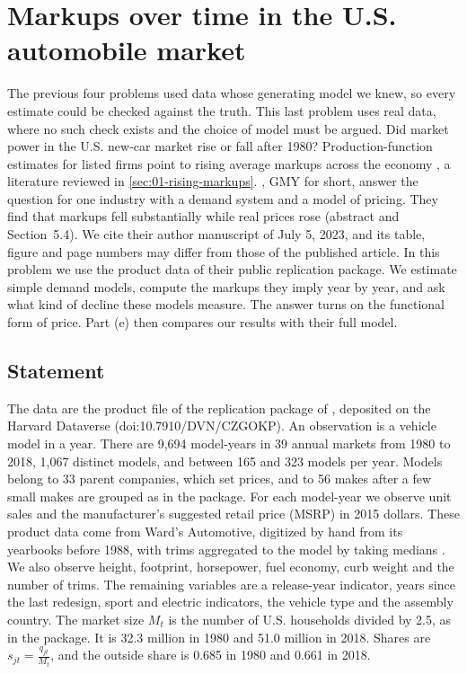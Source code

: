 \section{Markups over time in the U.S. automobile market}\label{sec:C-autos}

The previous four problems used data whose generating model we knew, so every estimate could be checked against the
truth. This last problem uses real data, where no such check exists and the choice of model must be argued. Did market
power in the U.S. new-car market rise or fall after 1980? Production-function estimates for listed firms
point to rising average markups across the economy \citep{DeLoeckerEeckhoutUnger2020}, a literature reviewed in
\cref{sec:01-rising-markups}. \citet{GriecoMurryYurukoglu2024}, GMY for short, answer the question for one industry
with a demand system and a model of pricing. They find that markups fell substantially while real prices rose (abstract and
Section~5.4). We cite their author manuscript of July 5, 2023, and its table, figure and page numbers may differ from
those of the published article. In this problem we use the product data of their public replication package. We
estimate simple demand models, compute the markups they imply year by year, and ask what kind of decline these models
measure. The answer turns on the functional form of price. Part (e) then compares our results with their full model.

\subsection{Statement}

The data are the product file of the replication package of \citet{GriecoMurryYurukoglu2024}, deposited on the Harvard
Dataverse (doi:10.7910/DVN/CZGOKP). An observation is a vehicle model in a year. There are 9,694 model-years in 39
annual markets from 1980 to 2018, 1,067 distinct models, and between 165 and 323 models per year. Models belong to 33
parent companies, which set prices, and to 56 makes after a few small makes are grouped as in the package. For each
model-year we observe unit sales and the manufacturer's suggested retail price (MSRP) in 2015 dollars. These product
data come from Ward's Automotive, digitized by hand from its yearbooks before 1988, with trims aggregated to the model by
taking medians \citep[Section~2.1]{GriecoMurryYurukoglu2024}. We also observe height, footprint, horsepower, fuel
economy, curb weight and the number of trims. The remaining variables are a release-year indicator, years since the last redesign, sport and electric
indicators, the vehicle type and the assembly country. The market size $M_t$ is the number of U.S.
households divided by 2.5, as in the package. It is 32.3 million in 1980 and 51.0 million in 2018. Shares are
$s_{jt} = \frac{q_{jt}}{M_t}$, and the outside share is 0.685 in 1980 and 0.661 in 2018.

